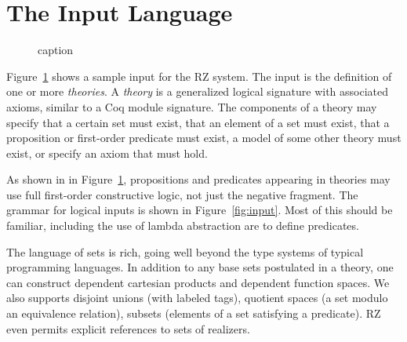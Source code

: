 \newcommand{\itag}{\mathit{tag}}
\newcommand{\iprod}[3]{#1{:}#2\times#3}
\newcommand{\isum}[4]{#1{:}#2+#3{:}#4}
\newcommand{\iquot}[2]{#1{\bigm/} #2}
\newcommand{\isubset}[3]{\{\,#1{:}#2\ |\ #3\,\}}

\newcommand{\iDefinition}[2]{\mathsf{Definition}\ #1\ :=\ #2.}
\newcommand{\iParameter}[2]{\mathsf{Parameter}\ #1\ : #2.}
\newcommand{\iAxiom}[2]{\mathsf{Axiom}\ #1\ : #2.}
\newcommand{\ipt}{\tau}
\newcommand{\ik}{\kappa}
\newcommand{\idarrow}[3]{(#1{:}#2){\to}#3}
\newcommand{\ite}{\theta}
\newcommand{\ith}{\Theta}
\newcommand{\iTH}{T}
\newcommand{\ithy}[1]{\mathsf{thy}\ #1\ \mathsf{end}}
\newcommand{\im}{M}
\newcommand{\iM}{m}
\newcommand{\il}{l}
\newcommand{\iSet}{\mathsf{Set}}
\newcommand{\iStable}{\mathsf{Stable}}
\newcommand{\iProp}{\mathsf{Prop}}
\newcommand{\iEquiv}[1]{\mathsf{Equiv}(#1)}
\newcommand{\ibar}{\ |\ }

\section{The Input Language}
\label{sec:input-language}

\begin{figure}[htbp]
	\caption{caption}
	\label{fig:typicalinput}
\end{figure}

Figure~\ref{fig:typicalinput} shows a sample input for the RZ system. The input is the
definition of one or more \emph{theories}. A \emph{theory} is a generalized
logical signature with associated axioms, similar to a Coq module signature.
The components of a theory may specify that a certain set must exist, that an
element of a set must exist, that a proposition or first-order predicate must
exist, a model of some other theory must exist, or specify an axiom that must
hold.

As shown in in Figure~\ref{fig:typicalinput}, propositions and predicates
appearing in theories may use full first-order constructive logic, not just the
negative fragment. The grammar for logical inputs is shown in
Figure~\ref{fig:input}. Most of this should be familiar, including the use of
lambda abstraction are to define predicates.

The language of sets is rich, going well beyond the type systems of typical
programming languages. In addition to any base sets postulated in a theory, one
can construct dependent cartesian products and dependent function spaces. We
also supports disjoint unions (with labeled tags), quotient spaces (a set
modulo an equivalence relation), subsets (elements of a set satisfying a
predicate). RZ even permits explicit references to sets of realizers.

